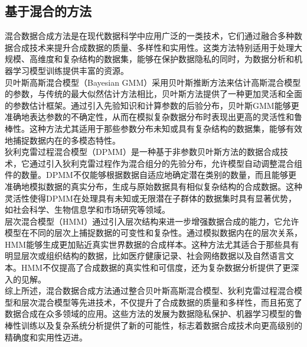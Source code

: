 \documentclass{NauThesis}
\begin{document}
\subsection{基于混合的方法}
混合数据合成方法是在现代数据科学中应用广泛的一类技术，它们通过融合多种数据合成技术来提升合成数据的质量、多样性和实用性。这类方法特别适用于处理大规模、高维度和复杂结构的数据集，能够在保护数据隐私的同时，为数据分析和机器学习模型训练提供丰富的资源。\\\hspace*{2em}贝叶斯高斯混合模型（Bayesian GMM）采用贝叶斯推断方法来估计高斯混合模型的参数，与传统的最大似然估计方法相比，贝叶斯方法提供了一种更加灵活和全面的参数估计框架。通过引入先验知识和计算参数的后验分布，贝叶斯GMM能够更准确地表达参数的不确定性，从而在模拟复杂数据分布时表现出更高的灵活性和鲁棒性\cite{ref45,ref46}。这种方法尤其适用于那些参数分布未知或具有复杂结构的数据集，能够有效地捕捉数据内在的多模态特性。\\\hspace*{2em}狄利克雷过程混合模型（DPMM）是一种基于非参数贝叶斯方法的数据合成技术，它通过引入狄利克雷过程作为混合组分的先验分布，允许模型自动调整混合组件的数量。DPMM不仅能够根据数据自适应地确定潜在类别的数量，而且能够更准确地模拟数据的真实分布，生成与原始数据具有相似复杂结构的合成数据\cite{ref47,ref48}。这种灵活性使得DPMM在处理具有未知或无限潜在子群体的数据集时具有显著优势，如社会科学、生物信息学和市场研究等领域。\\\hspace*{2em}层次混合模型（HMM）通过引入层次结构来进一步增强数据合成的能力，它允许模型在不同的层次上捕捉数据的可变性和复杂性。通过模拟数据内在的层次关系，HMM能够生成更加贴近真实世界数据的合成样本\cite{ref49,ref50}。这种方法尤其适合于那些具有明显层次或组织结构的数据，比如医疗健康记录、社会网络数据以及自然语言文本。HMM不仅提高了合成数据的真实性和可信度，还为复杂数据分析提供了更深入的见解。\\\hspace*{2em}综上所述，混合数据合成方法通过整合贝叶斯高斯混合模型、狄利克雷过程混合模型和层次混合模型等先进技术，不仅提升了合成数据的质量和多样性，而且拓宽了数据合成在众多领域的应用。这些方法的发展为数据隐私保护、机器学习模型的鲁棒性训练以及复杂系统分析提供了新的可能性，标志着数据合成技术向更高级别的精确度和实用性迈进。
\end{document}
